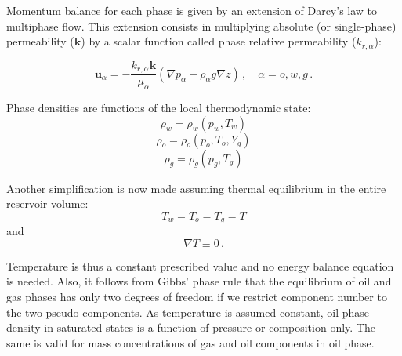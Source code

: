 \documentclass[authoryear,preprint,review,12pt]{elsarticle}
\begin{document}
%

Momentum balance for each phase is given by an extension of Darcy's law to multiphase flow. This extension consists in multiplying absolute (or single-phase) permeability ($\mathbf{k}$) by a scalar function called phase relative permeability ($k_{r,\alpha}$):

\begin{equation}\label{eq: exdarcy}
\mathbf{u}_\alpha = -\frac{k_{r,\alpha} \mathbf{k}}{\mu_\alpha} \left(\nabla p_\alpha - \rho_\alpha g\nabla z\right) \, , \quad \alpha=o,w,g \, .
\end{equation}

Phase densities are functions of the local thermodynamic state:
\begin{equation}
\rho_w = \rho_w \left(p_w, T_w\right)
\end{equation}
\begin{equation}
\rho_o = \rho_o \left(p_o, T_o,Y_g\right)
\end{equation}
\begin{equation}
\rho_g = \rho_g \left(p_g, T_g\right)
\end{equation}

Another simplification is now made assuming thermal equilibrium in the entire reservoir volume:
\begin{equation}
T_w = T_o = T_g = T
\end{equation}
and
\begin{equation}
\nabla T \equiv 0 \, .
\end{equation}

Temperature is thus a constant prescribed value and no energy balance equation is needed. Also, it follows from Gibbs' phase rule that the equilibrium of oil and gas phases has only two degrees of freedom if we restrict component number to the two pseudo-components. As temperature is assumed constant, oil phase density in saturated states is a function of pressure or composition only. The same is valid for mass concentrations of gas and oil components in oil phase.
\end{document}
